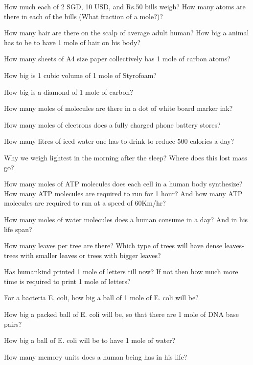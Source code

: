 \documentclass[11pt]{exam}
\begin{document}
\begin{questions}
                                   
        
               
        
        

\question
\label{Q:Dollar bills}
 How much each of 2 SGD, 10 USD, and Rs.50 bills weigh? How many atoms are there in each of the bills (What fraction of a mole?)?
 
\question
\label{Hair}
How many hair are there on the scalp of average adult human? How big a animal has to be to have 1 mole of hair on his body?

\question
\label{Q:A4 paper}
How many sheets of A4 size paper collectively has 1 mole of carbon atoms?

\question
\label{Q:Styrofoam}
How big is 1 cubic volume of 1 mole of Styrofoam?

\question
\label{Q:Diamond}
How big is a diamond of 1 mole of carbon?

\question
\label{Q: A dot of ink}
How many moles of molecules are there in a dot of white board marker ink?

\question
\label{Q:Phone battery}
How many moles of electrons does a fully charged phone battery stores? 

\question
\label{Q:Shade Calories}
How many litres of iced water one has to drink to reduce 500 calories a day?

\question
\label{Q:Lightest morning}
Why we weigh lightest in the morning after the sleep? Where does this lost mass go?

\question
\label{Q:ATPs}
How many moles of ATP molecules does each cell in a human body synthesize? How many ATP molecules are required to run for 1 hour? And how many ATP molecules are required to run at a speed of 60Km/hr?

\question
\label{Q:Moles of water molecules}
How many moles of water molecules does a human consume in a day? And in his life span?

\question
\label{Q:Leaves on trees}
How many leaves per tree are there? Which type of trees will have dense leaves- trees with smaller leaves or trees with bigger leaves?

\question
\label{Q:Number of letters}
Has humankind printed 1 mole of letters till now? If not then how much more time is required to print 1 mole of letters?

\question
\label{Q:E.coli}
For a bacteria E. coli, how big a ball of 1 mole of E. coli will be? 

\question
\label{Q:E.coli and DNA basepairs}
How big a packed ball of E. coli will be, so that there are 1 mole of DNA base pairs?

\question
\label{Q:E.coli and water}
How big a ball of E. coli will be to have 1 mole of water?

\question
\label{Q:Memory units}
How many memory units does a human being has in his life?




\end{questions} 
\end{document}
